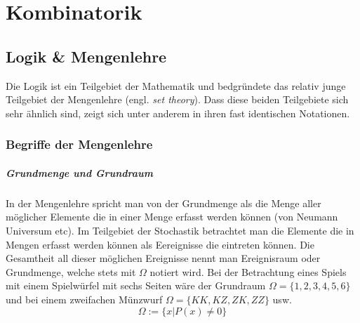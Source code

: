 



\chapter{Kombinatorik}
\newpage

\section{Logik \& Mengenlehre}
Die Logik ist ein Teilgebiet der Mathematik und bedgründete das relativ
junge Teilgebiet der Mengenlehre (engl. \emph{set theory}). Dass diese 
beiden Teilgebiete sich sehr ähnlich sind, zeigt sich unter anderem in
ihren fast identischen Notationen.


\subsection{Begriffe der Mengenlehre}
\paragraph{Grundmenge und Grundraum}
In der Mengenlehre spricht man von der Grundmenge als die Menge aller
möglicher Elemente die in einer Menge erfasst werden können (von Neumann
Universum etc). Im Teilgebiet der Stochastik betrachtet man die
Elemente die in Mengen erfasst werden können als Eereignisse die eintreten
können. Die Gesamtheit all dieser möglichen Ereignisse nennt man 
Ereignisraum oder Grundmenge, welche stets mit $\Omega$ notiert wird. 
Bei der Betrachtung eines Spiels mit einem Spielwürfel mit sechs Seiten 
wäre der Grundraum $\Omega=\{1,2,3,4,5,6\}$ und bei einem zweifachen
Münzwurf $\Omega=\{KK, KZ, ZK, ZZ\}$ usw.
\[  
	\Omega := \{x| P(x) \neq 0\}
\]

